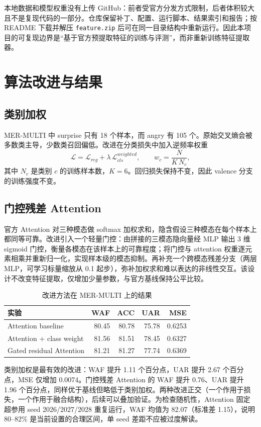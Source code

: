 ﻿\documentclass[a4paper,11pt]{ctexart}
\begin{document}
本地数据和模型权重没有上传 GitHub：前者受官方分发方式限制，后者体积较大且不是复现代码的一部分。仓库保留补丁、配置、运行脚本、结果索引和报告；按 README 下载并解压 \texttt{feature.zip} 后可在同一目录结构中重新运行。因此本项目的可复现边界是“基于官方预提取特征的训练与评测”，而非重新训练特征提取器。

\section{算法改进与结果}

\subsection{类别加权}

MER-MULTI 中 surprise 只有 18 个样本，而 angry 有 105 个。原始交叉熵会被多数类主导，少数类召回偏低。改进在分类损失中加入逆频率权重
\[
\mathcal{L}=\mathcal{L}_{reg}+\lambda\,\mathcal{L}_{cls}^{weighted},\qquad
w_c=\frac{N}{K\,N_c},
\]
其中 $N_c$ 是类别 $c$ 的训练样本数，$K=6$。回归损失保持不变，因此 valence 分支的训练强度不变。

\subsection{门控残差 Attention}

官方 Attention 对三种模态做 softmax 加权求和，隐含假设三种模态在每个样本上都同等可靠。改进引入一个轻量门控：由拼接的三模态隐向量经 MLP 输出 3 维 sigmoid 门控，衡量各模态在该样本上的可靠程度；将门控与 attention 权重逐元素相乘并重新归一化，实现样本级的模态抑制。再补充一个跨模态残差分支（两层 MLP，可学习标量缩放从 0.1 起步），弥补加权求和难以表达的非线性交互。该设计不改变特征提取，仅增加少量参数，与官方基线保持公平比较。

\begin{table}[htbp]
\centering
\small
\caption{改进方法在 MER-MULTI 上的结果}
\begin{tabular}{lrrrr}
\toprule
实验 & WAF & ACC & UAR & MSE\\
\midrule
Attention baseline & 80.45 & 80.78 & 75.78 & 0.6253\\
Attention + class weight & 81.56 & 81.51 & 78.45 & 0.6327\\
Gated residual Attention & 81.21 & 81.27 & 77.74 & 0.6369\\
\bottomrule
\end{tabular}
\end{table}

类别加权是最有效的改进：WAF 提升 1.11 个百分点，UAR 提升 2.67 个百分点，MSE 仅增加 0.0074。门控残差 Attention 的 WAF 提升 0.76、UAR 提升 1.96 个百分点，同样优于基线但略低于类别加权。两种改进正交（一个作用于损失，一个作用于融合结构），后续可以叠加验证。为检查随机性，Attention 固定超参用 seed 2026/2027/2028 重复运行，WAF 均值为 82.07（标准差 1.15），说明 80--82\% 是当前设置的合理区间，单 seed 差距不应被过度解读。
\end{document}
